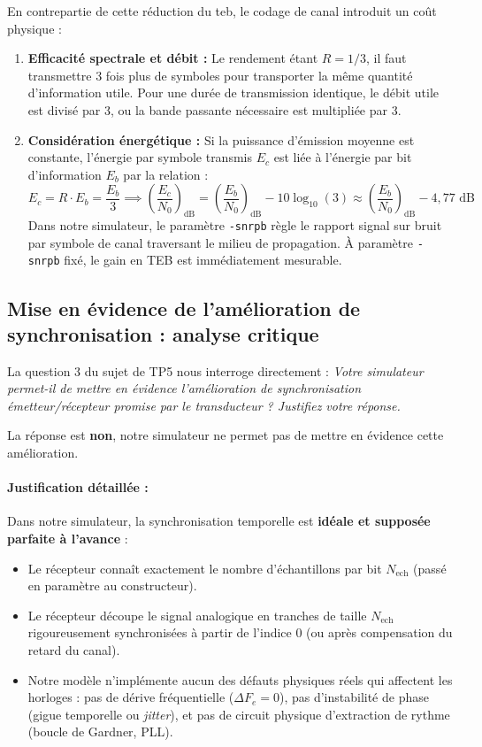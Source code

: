 \documentclass[a4paper,12pt]{report}
\begin{document}
En contrepartie de cette réduction du \gls{teb}, le codage de canal introduit un coût physique :
\begin{enumerate}
    \item \textbf{Efficacité spectrale et débit :} Le rendement étant $R = 1/3$, il faut transmettre 3 fois plus de symboles pour transporter la même quantité d'information utile. Pour une durée de transmission identique, le débit utile est divisé par 3, ou la bande passante nécessaire est multipliée par 3.
    \item \textbf{Considération énergétique :} Si la puissance d'émission moyenne est constante, l'énergie par symbole transmis $E_c$ est liée à l'énergie par bit d'information $E_b$ par la relation :
    \[
        E_c = R \cdot E_b = \frac{E_b}{3} \implies \left(\frac{E_c}{N_0}\right)_{\text{dB}} = \left(\frac{E_b}{N_0}\right)_{\text{dB}} - 10 \log_{10}(3) \approx \left(\frac{E_b}{N_0}\right)_{\text{dB}} - 4{,}77\text{ dB}
    \]
    Dans notre simulateur, le paramètre \texttt{-snrpb} règle le rapport signal sur bruit par symbole de canal traversant le milieu de propagation. À paramètre \texttt{-snrpb} fixé, le gain en TEB est immédiatement mesurable.
\end{enumerate}

\subsection{Mise en évidence de l'amélioration de synchronisation : analyse critique}

La question 3 du sujet de TP5 nous interroge directement : \textit{\og{}Votre simulateur permet-il de mettre en évidence l'amélioration de synchronisation émetteur/récepteur promise par le transducteur ? Justifiez votre réponse.\fg{}}

La réponse est \textbf{non}, notre simulateur ne permet pas de mettre en évidence cette amélioration.

\paragraph{Justification détaillée :}
Dans notre simulateur, la synchronisation temporelle est \textbf{idéale et supposée parfaite à l'avance} :
\begin{itemize}
    \item Le récepteur connaît exactement le nombre d'échantillons par bit $N_{\text{ech}}$ (passé en paramètre au constructeur).
    \item Le récepteur découpe le signal analogique en tranches de taille $N_{\text{ech}}$ rigoureusement synchronisées à partir de l'indice 0 (ou après compensation du retard du canal).
    \item Notre modèle n'implémente aucun des défauts physiques réels qui affectent les horloges : pas de dérive fréquentielle ($\Delta F_e = 0$), pas d'instabilité de phase (gigue temporelle ou \textit{jitter}), et pas de circuit physique d'extraction de rythme (boucle de Gardner, PLL).
\end{itemize}
\end{document}

